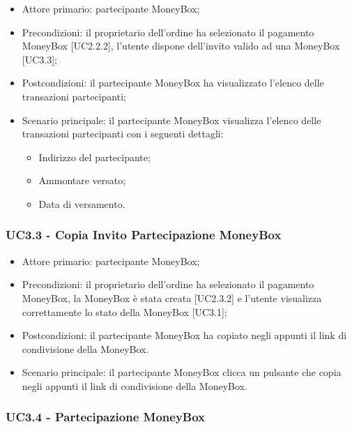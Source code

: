 \begin{itemize}
    \item Attore primario: partecipante MoneyBox\glo{};
    \item Precondizioni: il proprietario dell'ordine ha selezionato il pagamento MoneyBox\glo{} [UC2.2.2], 
            l'utente dispone dell'invito valido ad una MoneyBox\glo{} [UC3.3];
    \item Postcondizioni: il partecipante MoneyBox\glo{} ha visualizzato l'elenco delle transazioni partecipanti;
    \item Scenario principale: il partecipante MoneyBox\glo{} visualizza l'elenco delle transazioni partecipanti con i seguenti dettagli:
        \begin{itemize}
            \item Indirizzo del partecipante;
            \item Ammontare versato;
            \item Data di versamento.
        \end{itemize}
\end{itemize}

\subsubsection{UC3.3 - Copia Invito Partecipazione MoneyBox}

\begin{itemize}
    \item Attore primario: partecipante MoneyBox\glo{};
    \item Precondizioni: il proprietario dell'ordine ha selezionato il pagamento MoneyBox\glo [UC2.2.2], la MoneyBox\glo{} è stata creata [UC2.3.2] e l'utente visualizza correttamente lo stato della MoneyBox\glo{} [UC3.1];
    \item Postcondizioni: il partecipante MoneyBox\glo{} ha copiato negli appunti il link di condivisione della MoneyBox\glo{}.
    \item Scenario principale: il partecipante MoneyBox\glo{} clicca un pulsante che copia negli appunti il link di condivisione della MoneyBox\glo{}.
\end{itemize}

\subsubsection{UC3.4 - Partecipazione MoneyBox}

